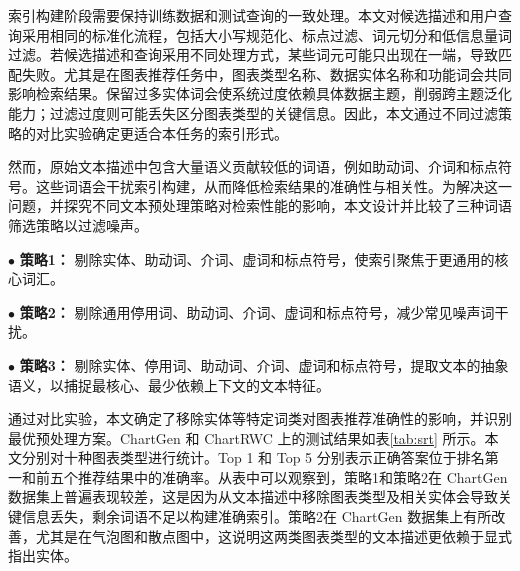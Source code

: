 索引构建阶段需要保持训练数据和测试查询的一致处理。本文对候选描述和用户查询采用相同的标准化流程，包括大小写规范化、标点过滤、词元切分和低信息量词过滤。若候选描述和查询采用不同处理方式，某些词元可能只出现在一端，导致匹配失败。尤其是在图表推荐任务中，图表类型名称、数据实体名称和功能词会共同影响检索结果。保留过多实体词会使系统过度依赖具体数据主题，削弱跨主题泛化能力；过滤过度则可能丢失区分图表类型的关键信息。因此，本文通过不同过滤策略的对比实验确定更适合本任务的索引形式。

然而，原始文本描述中包含大量语义贡献较低的词语，例如助动词、介词和标点符号。这些词语会干扰索引构建，从而降低检索结果的准确性与相关性。为解决这一问题，并探究不同文本预处理策略对检索性能的影响，本文设计并比较了三种词语筛选策略以过滤噪声。

$\bullet$ \textbf{策略1：} 剔除实体、助动词、介词、虚词和标点符号，使索引聚焦于更通用的核心词汇。

$\bullet$ \textbf{策略2：} 剔除通用停用词、助动词、介词、虚词和标点符号，减少常见噪声词干扰。

$\bullet$ \textbf{策略3：} 剔除实体、停用词、助动词、介词、虚词和标点符号，提取文本的抽象语义，以捕捉最核心、最少依赖上下文的文本特征。

通过对比实验，本文确定了移除实体等特定词类对图表推荐准确性的影响，并识别最优预处理方案。ChartGen 和 ChartRWC 上的测试结果如表\ref{tab:srt} 所示。本文分别对十种图表类型进行统计。Top 1 和 Top 5 分别表示正确答案位于排名第一和前五个推荐结果中的准确率。从表中可以观察到，策略1和策略2在 ChartGen 数据集上普遍表现较差，这是因为从文本描述中移除图表类型及相关实体会导致关键信息丢失，剩余词语不足以构建准确索引。策略2在 ChartGen 数据集上有所改善，尤其是在气泡图和散点图中，这说明这两类图表类型的文本描述更依赖于显式指出实体。

